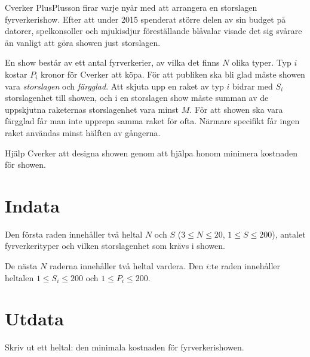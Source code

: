 Cverker PlusPlusson firar varje nyår med att arrangera en storslagen fyrverkerishow. Efter att under 2015 spenderat större delen av sin budget på datorer, spelkonsoller och mjukisdjur föreställande blåvalar visade det sig svårare än vanligt att göra showen just storslagen.

En show består av ett antal fyrverkerier, av vilka det finns $N$ olika typer. Typ $i$ kostar $P_i$ kronor för Cverker att köpa. För att publiken ska bli glad måste showen vara \emph{storslagen} och \emph{färgglad}. Att skjuta upp en raket av typ $i$ bidrar med $S_i$ storslagenhet till showen, och i en storslagen show måste summan av de uppskjutna raketernas storslagenhet vara minst $M$. För att showen ska vara färgglad får man inte upprepa samma raket för ofta. Närmare specifikt får ingen raket användas minst hälften av gångerna.

Hjälp Cverker att designa showen genom att hjälpa honom minimera kostnaden för showen.

\section*{Indata}
Den första raden innehåller två heltal $N$ och $S$ ($3 \le N \le 20$, $1 \le S \le 200$), antalet
fyrverkerityper och vilken storslagenhet som krävs i showen.

De nästa $N$ raderna innehåller två heltal vardera. Den $i$:te raden innehåller heltalen $1 \le S_i \le 200$ och $1 \le P_i \le 200$.

\section*{Utdata}
Skriv ut ett heltal: den minimala kostnaden för fyrverkerishowen.
